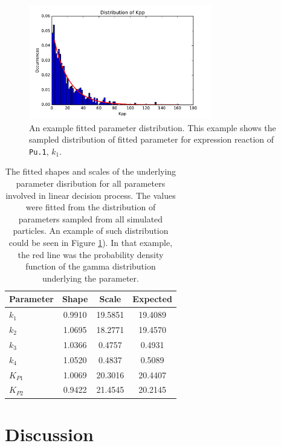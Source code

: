 \documentclass{bioinfo}
\begin{document}
\begin{figure}[h]
\includegraphics[width=8cm]{figures/kpp.pdf}
\caption{An example fitted parameter distribution. This example shows the sampled distribution of fitted parameter for expression reaction of \texttt{Pu.1}, \texttt{$k_1$}. }  \label{fig:04}
\end{figure}

\begin{table}[h]
\begin{center}
\begin{tabular}{|l | c | c | c |}
\hline
Parameter & Shape & Scale & Expected \\
\hline
\texttt{$k_1$} & 0.9910 & 19.5851 & 19.4089 \\
\texttt{$k_2$} & 1.0695 & 18.2771 & 19.4570 \\
\texttt{$k_3$} & 1.0366 & 0.4757 & 0.4931 \\
\texttt{$k_4$} & 1.0520 & 0.4837 & 0.5089 \\
\texttt{$K_{P1}$} & 1.0069 & 20.3016 & 20.4407 \\
\texttt{$K_{P2}$} & 0.9422 & 21.4545 & 20.2145 \\
\hline
\end{tabular}

\vspace*{5pt}

\caption{The fitted shapes and scales of the underlying parameter disribution for all parameters involved in linear decision process. The values were fitted from the distribution of parameters sampled from all simulated particles. An example of such distribution could be seen in Figure \ref{fig:04}). In that example, the red line was the probability density function of the gamma distribution underlying the parameter.}
\end{center}
\label{tab:01}
\end{table}

\vspace*{-12pt}

\section{Discussion}
\end{document}
